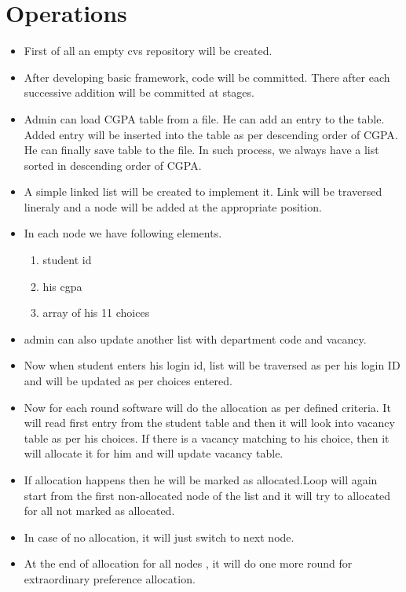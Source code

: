 \documentclass[a4paper,10pt]{report} %
\begin{document}
\chapter{Operations}
\begin{itemize}

  \item First of all an empty cvs repository will be created.
  \item After developing basic framework, code will be committed. There after each successive addition will be committed at stages.
  \item Admin can load CGPA table from a file. He can add an entry to the table. Added entry will be inserted into the table as per
descending order of CGPA. He can finally save table to the file. In such process, we always have a list sorted in descending order of CGPA.
\item A simple linked list will be created to implement it. Link will be traversed lineraly and a node will be added at the appropriate position.
\item In each node we have following elements.
\begin{enumerate}
 \item student id
 \item his cgpa
 \item array of his 11 choices
\end{enumerate}
\item admin can also update another list with department code and vacancy.
\item Now when student enters his login id, list will be traversed as per his login ID and will be updated as per choices entered.
\item Now for each round software will do the allocation as per defined criteria. It will read first entry from the student table and then it will look
into vacancy table as per his choices. If there is a vacancy matching to his choice, then it will allocate it for him and will update vacancy table.
\item If allocation happens then he will be marked as allocated.Loop will again start from the first non-allocated node of the list and it will try to
 allocated for all not marked as allocated.
\item In case of no allocation, it will just switch to next node.
\item At the end of allocation for all nodes , it will do one more round for extraordinary preference allocation.
 \end{itemize}
\end{document}

